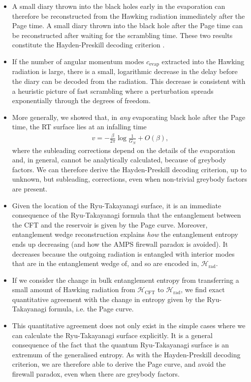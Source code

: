 \documentclass[11pt,a4paper]{article}
\begin{document}
\begin{itemize}
\item A small diary thrown into the black holes early in the evaporation can therefore be reconstructed from the Hawking radiation immediately after the Page time. A small diary thrown into the black hole after the Page time can be reconstructed after waiting for the scrambling time. These two results constitute the Hayden-Preskill decoding criterion \cite{hayden2007black}.

\item If the number of angular momentum modes $c_\text{evap}$ extracted into the Hawking radiation is large, there is a small, logarithmic decrease in the delay before the diary can be decoded from the radiation. This decrease is consistent with a heuristic picture of fast scrambling where a perturbation spreads exponentially through the degrees of freedom.

\item More generally, we showed that, in \emph{any} evaporating black hole after the Page time, the RT surface lies at an infalling time
\begin{align}
v = - \frac{\beta}{2 \pi} \log\frac{1}{G_N} + O(\beta),
\end{align}
where the subleading corrections depend on the details of the evaporation and, in general, cannot be analytically calculated, because of greybody factors. We can therefore derive the Hayden-Preskill decoding criterion, up to unknown, but subleading, corrections, even when non-trivial greybody factors are present.

\item Given the location of the Ryu-Takayanagi surface, it is an immediate consequence of the Ryu-Takayanagi formula that the entanglement between the CFT and the reservoir is given by the Page curve. Moreover, entanglement wedge reconstruction explains \emph{how} the entanglement entropy ends up decreasing (and how the AMPS firewall paradox is avoided). It decreases because the outgoing radiation is entangled with interior modes that are in the entanglement wedge of, and so are encoded in, $\mathcal{H}_\text{rad}$. 

\item If we consider the change in bulk entanglement entropy from transferring a small amount of Hawking radiation from $\mathcal{H}_\text{CFT}$ to $\mathcal{H}_\text{rad}$, we find exact quantitative agreement with the change in entropy given by the Ryu-Takayanagi formula, i.e. the Page curve.

\item This quantitative agreement does not only exist in the simple cases where we can calculate the Ryu-Takayanagi surface explicitly. It is a general consequence of the fact that the quantum Ryu-Takayanagi surface is an extremum of the generalised entropy. As with the Hayden-Preskill decoding criterion, we are therefore able to derive the Page curve, and avoid the firewall paradox, even when there are greybody factors.


\end{itemize}
\end{document}
